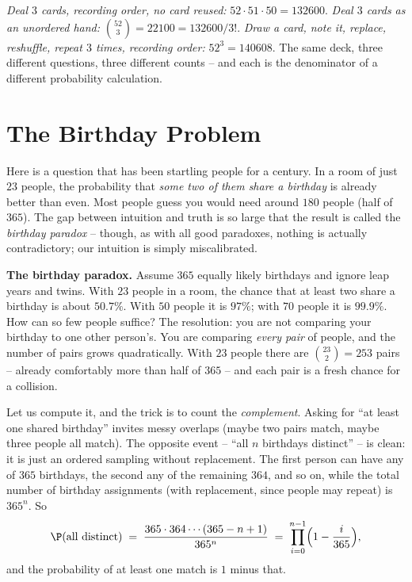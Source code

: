 \begin{example}
\label{ch2:ex-three}
\emph{Deal $3$ cards, recording order, no card reused:} $52 \cdot 51 \cdot 50 = 132600$.
\emph{Deal $3$ cards as an unordered hand:} $\binom{52}{3} = 22100 = 132600/3!$.
\emph{Draw a card, note it, replace, reshuffle, repeat $3$ times, recording order:}
$52^3 = 140608$. The same deck, three different questions, three different counts -- and
each is the denominator of a different probability calculation.
\end{example}

\section{The Birthday Problem}
\label{ch2:birthday}

Here is a question that has been startling people for a century. In a room of just $23$
people, the probability that \emph{some two of them share a birthday} is already better
than even. Most people guess you would need around $180$ people (half of $365$). The gap
between intuition and truth is so large that the result is called the \emph{birthday
paradox} -- though, as with all good paradoxes, nothing is actually contradictory; our
intuition is simply miscalibrated.

\begin{paradoxbox}
\textbf{The birthday paradox.} Assume $365$ equally likely birthdays and ignore leap years
and twins. With $23$ people in a room, the chance that at least two share a birthday is
about $50.7\%$. With $50$ people it is $97\%$; with $70$ people it is $99.9\%$. How can so
few people suffice? The resolution: you are not comparing your birthday to one other
person's. You are comparing \emph{every pair} of people, and the number of pairs grows
quadratically. With $23$ people there are $\binom{23}{2} = 253$ pairs -- already comfortably
more than half of $365$ -- and each pair is a fresh chance for a collision.
\end{paradoxbox}

Let us compute it, and the trick is to count the \emph{complement}. Asking for ``at least
one shared birthday'' invites messy overlaps (maybe two pairs match, maybe three people all
match). The opposite event -- ``all $n$ birthdays distinct'' -- is clean: it is just an
ordered sampling without replacement. The first person can have any of $365$ birthdays, the
second any of the remaining $364$, and so on, while the total number of birthday assignments
(with replacement, since people may repeat) is $365^n$. So
\[
  \P(\text{all distinct})
  \;=\; \frac{365 \cdot 364 \cdots (365 - n + 1)}{365^n}
  \;=\; \prod_{i=0}^{n-1}\Bigl(1 - \frac{i}{365}\Bigr),
\]
and the probability of at least one match is $1$ minus that.

